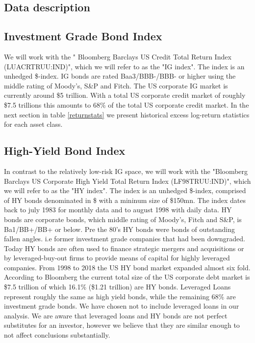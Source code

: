 \documentclass[11pt,a4paper,oneside]{article}
\begin{document}
\subsection{Data description}\label{datadescription}

\subsection*{Investment Grade Bond Index}
\noindent We will work with the " Bloomberg Barclays US Credit Total Return Index (LUACRTRUU:IND)", which we will refer to as the "IG index". The index is an unhedged \$-index. IG bonds are rated Baa3/BBB-/BBB- or higher using the middle rating of Moody's, S\&P and Fitch. The US corporate IG market is currently around \$5 trillion. With a total US corporate credit market of roughly \$7.5 trillions this amounts to 68\% of the total US corporate credit market\cite{Bloomberg}. In the next section in table \ref{returnstats} we present historical excess log-return statistics for each asset class.

\subsection*{High-Yield Bond Index}
\noindent In contrast to the relatively low-risk IG space, we will work with the "Bloomberg Barclays US Corporate High Yield Total Return Index (LF98TRUU:IND)", which we will refer to as the "HY index". The index is an unhedged \$-index, comprised of HY bonds denominated in \$ with a mininum size of \$150mn. The index dates back to july 1983 for monthly data and to august 1998 with daily data. HY bonds are corporate bonds, which middle rating of Moody's, Fitch and S\&P, is Ba1/BB+/BB+ or below. Pre the 80's HY bonds were bonds of outstanding fallen angles. i.e former investment grade companies that had been downgraded. Today HY bonds are often used to finance strategic mergers and acquisitions or  by leveraged-buy-out firms to provide means of capital for highly leveraged companies. From 1998 to 2018 the US HY bond market expanded almost six fold\cite{Pimpco}. According to Bloomberg the current total size of the US corporate debt market is \$7.5 trillion of which 16.1\% (\$1.21 trillion) are HY bonds. Leveraged Loans represent roughly the same as high yield bonds, while the remaining 68\% are investment grade bonds\cite{Bloomberg}. We have chosen not to include leveraged loans in our analysis. We are aware that leveraged loans and HY bonds are not perfect substitutes for an investor, however we believe that they are similar enough to not affect conclusions substantially.         
\end{document}
